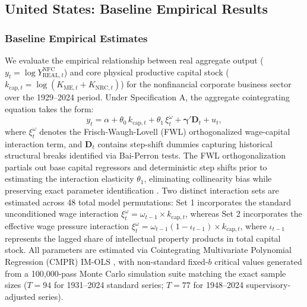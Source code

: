 \subsection{United States: Baseline Empirical Results}

\subsubsection{Baseline Empirical Estimates}
\label{sec:431:specA_results}

We evaluate the empirical relationship between real aggregate output ($y_t = \log Y_{\text{REAL},t}^{\text{NFC}}$) and core physical productive capital stock ($k_{\text{cap},t} = \log(K_{\text{ME},t} + K_{\text{NRC},t})$) for the nonfinancial corporate business sector over the 1929--2024 period. Under Specification A, the aggregate cointegrating equation takes the form:
\begin{equation}
	y_t = \alpha + \theta_0\, k_{\text{cap},t} + \theta_1\, \xi^{\omega}_t + \boldsymbol{\gamma}' \mathbf{D}_t + u_t,
	\label{eq:431:specA_model}
\end{equation}
where $\xi^{\omega}_t$ denotes the Frisch-Waugh-Lovell (FWL) orthogonalized wage-capital interaction term, and $\mathbf{D}_t$ contains step-shift dummies capturing historical structural breaks identified via Bai-Perron tests. The FWL orthogonalization partials out base capital regressors and deterministic step shifts prior to estimating the interaction elasticity $\theta_1$, eliminating collinearity bias while preserving exact parameter identification \citep{VogelsangWagner2014}. Two distinct interaction sets are estimated across 48 total model permutations: Set 1 incorporates the standard unconditioned wage interaction $\xi^{\omega}_t = \omega_{t-1} \times k_{\text{cap},t}$, whereas Set 2 incorporates the effective wage pressure interaction $\xi^{\omega}_t = \omega_{t-1}(1 - \iota_{t-1}) \times k_{\text{cap},t}$, where $\iota_{t-1}$ represents the lagged share of intellectual property products in total capital stock. All parameters are estimated via Cointegrating Multivariate Polynomial Regression (CMPR) IM-OLS \citep{VogelsangWagner2014}, with non-standard fixed-$b$ critical values generated from a 100,000-pass Monte Carlo simulation suite matching the exact sample sizes ($T = 94$ for 1931--2024 standard series; $T = 77$ for 1948--2024 supervisory-adjusted series).

